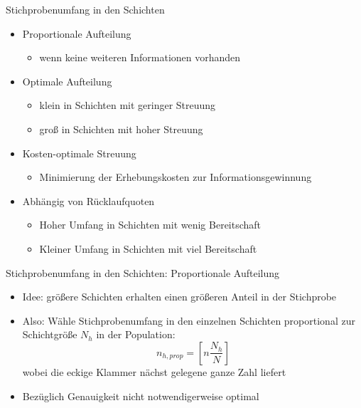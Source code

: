 \documentclass[9pt]{beamer}
\begin{document}
\begin{frame}{Stichprobenumfang in den Schichten}
\begin{itemize}
	\item Proportionale Aufteilung
	\begin{itemize}
		\item wenn keine weiteren Informationen vorhanden
	\end{itemize}
	\item Optimale Aufteilung
	\begin{itemize}
		\item klein in Schichten mit geringer Streuung
		\item groß in Schichten mit hoher Streuung
	\end{itemize}
	\item Kosten-optimale Streuung
	\begin{itemize}
		\item Minimierung der Erhebungskosten zur Informationsgewinnung
	\end{itemize}
	\item Abhängig von Rücklaufquoten
	\begin{itemize}
		\item Hoher Umfang in Schichten mit wenig Bereitschaft
		\item Kleiner Umfang in Schichten mit viel Bereitschaft
	\end{itemize}
\end{itemize}
\end{frame}

\begin{frame}{Stichprobenumfang in den Schichten: Proportionale Aufteilung}
\begin{itemize}
	\item Idee: größere Schichten erhalten einen größeren Anteil in der Stichprobe
	\item Also: Wähle Stichprobenumfang in den einzelnen Schichten proportional zur Schichtgröße $N_h$ in der Population:
	$$n_{h,prop}=\left[n\frac{N_h}{N}\right]$$
	wobei die eckige Klammer nächst gelegene ganze Zahl liefert
	\item Bezüglich Genauigkeit nicht notwendigerweise optimal
\end{itemize}
\end{frame}
\end{document}
